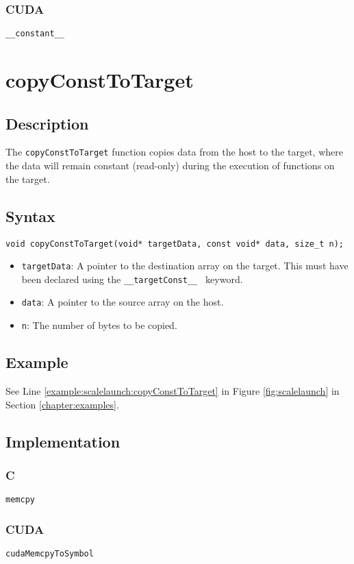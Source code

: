 \subsubsection{CUDA}
\verb+__constant__+

\newpage
\section{copyConstToTarget}

\subsection{Description}

The \verb+copyConstToTarget+ function copies data from the host to the target, where the data will remain constant (read-only) during the execution of functions on the target.

\subsection{Syntax}
\begin{verbatim}
void copyConstToTarget(void* targetData, const void* data, size_t n);
\end{verbatim}

\begin{itemize}
\item \verb+targetData+: A pointer to the destination array on the target. This must have been declared using the \verb+__targetConst__ + keyword.
\item \verb+data+: A pointer to the source array on the host.
\item \verb+n+: The number of bytes to be copied.
\end{itemize}


\subsection{Example}
See Line \ref{example:scalelaunch:copyConstToTarget} in Figure \ref{fig:scalelaunch} in Section \ref{chapter:examples}.
\subsection{Implementation}
\subsubsection{C}
\verb+memcpy+
\subsubsection{CUDA}
\verb+cudaMemcpyToSymbol+

